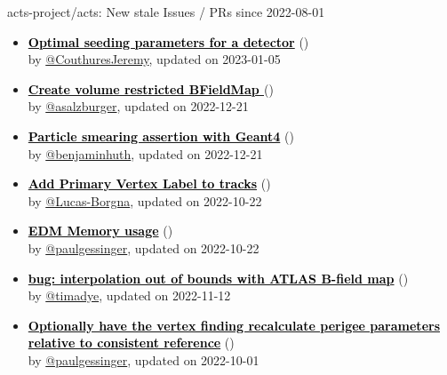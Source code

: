 \begin{frame}[allowframebreaks]{ acts-project/acts: New stale Issues / PRs since 2022-08-01 }
\begin{itemize}
    \item\iss\prstale\textbf{\href{https://github.com/acts-project/acts/issues/1699}{\textcolor{black}{Optimal seeding parameters for a detector}}}
    (\href{https://github.com/acts-project/acts/issues/1699}{}) \\
    by \href{https://github.com/CouthuresJeremy}{@CouthuresJeremy}, updated on 2023-01-05

    \item\iss\prstale\textbf{\href{https://github.com/acts-project/acts/issues/1659}{\textcolor{black}{Create volume restricted BFieldMap }}}
    (\href{https://github.com/acts-project/acts/issues/1659}{}) \\
    by \href{https://github.com/asalzburger}{@asalzburger}, updated on 2022-12-21

    \item\iss\prstale\textbf{\href{https://github.com/acts-project/acts/issues/1603}{\textcolor{black}{Particle smearing assertion with Geant4}}}
    (\href{https://github.com/acts-project/acts/issues/1603}{}) \\
    by \href{https://github.com/benjaminhuth}{@benjaminhuth}, updated on 2022-12-21

    \item\iss\prstale\textbf{\href{https://github.com/acts-project/acts/issues/1544}{\textcolor{black}{Add Primary Vertex Label to tracks}}}
    (\href{https://github.com/acts-project/acts/issues/1544}{}) \\
    by \href{https://github.com/Lucas-Borgna}{@Lucas-Borgna}, updated on 2022-10-22

    \item\iss\prstale\textbf{\href{https://github.com/acts-project/acts/issues/1516}{\textcolor{black}{EDM Memory usage}}}
    (\href{https://github.com/acts-project/acts/issues/1516}{}) \\
    by \href{https://github.com/paulgessinger}{@paulgessinger}, updated on 2022-10-22

    \item\iss\prstale\textbf{\href{https://github.com/acts-project/acts/issues/1484}{\textcolor{black}{bug: interpolation out of bounds with ATLAS B-field map}}}
    (\href{https://github.com/acts-project/acts/issues/1484}{}) \\
    by \href{https://github.com/timadye}{@timadye}, updated on 2022-11-12

    \item\iss\prstale\textbf{\href{https://github.com/acts-project/acts/issues/1482}{\textcolor{black}{Optionally have the vertex finding recalculate perigee parameters relative to consistent reference}}}
    (\href{https://github.com/acts-project/acts/issues/1482}{}) \\
    by \href{https://github.com/paulgessinger}{@paulgessinger}, updated on 2022-10-01


\end{itemize}
\end{frame}
